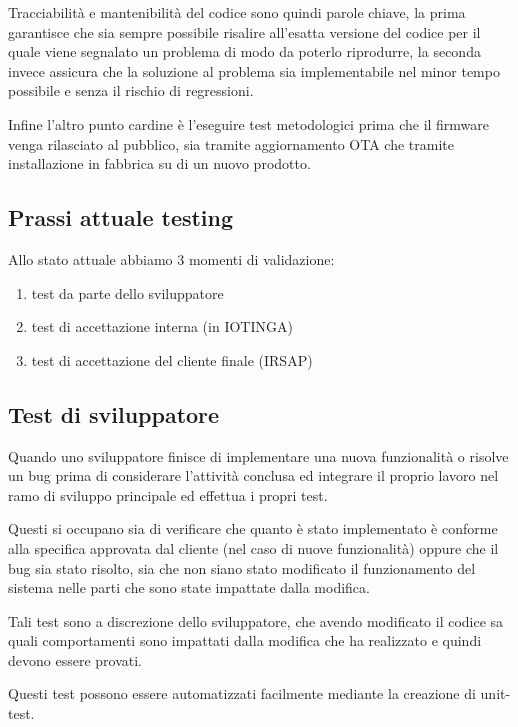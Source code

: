 \documentclass[12pt,a4paper,twoside,titlepage]{book}
\begin{document}
Tracciabilità e mantenibilità del codice sono quindi parole chiave, la prima garantisce che
sia sempre possibile risalire all'esatta versione del codice per il quale viene segnalato un
problema di modo da poterlo riprodurre, la seconda invece assicura che la soluzione al problema
sia implementabile nel minor tempo possibile e senza il rischio di regressioni.

Infine l'altro punto cardine è l'eseguire test metodologici prima che il firmware venga
rilasciato al pubblico, sia tramite aggiornamento OTA che tramite installazione in fabbrica
su di un nuovo prodotto.

\subsection{Prassi attuale testing}

Allo stato attuale abbiamo 3 momenti di validazione:

\begin{enumerate}
    \item test da parte dello sviluppatore
    \item test di accettazione interna (in IOTINGA)
    \item test di accettazione del cliente finale (IRSAP)
\end{enumerate}

\subsection{Test di sviluppatore}

Quando uno sviluppatore finisce di implementare una nuova funzionalità o risolve un
bug  prima di considerare l'attività conclusa ed integrare il
proprio lavoro nel ramo di sviluppo principale ed effettua i propri test.

Questi si occupano sia di verificare che quanto è stato implementato è conforme
alla specifica approvata dal cliente (nel caso di nuove funzionalità) oppure che
il bug sia stato risolto, sia che non siano stato modificato il funzionamento del sistema
nelle parti che sono state impattate dalla modifica.

Tali test sono a discrezione dello sviluppatore, che avendo modificato il codice sa
quali comportamenti sono impattati dalla modifica che ha realizzato e quindi devono essere
provati.

Questi test possono essere automatizzati facilmente mediante la creazione di unit-test.
\end{document}
